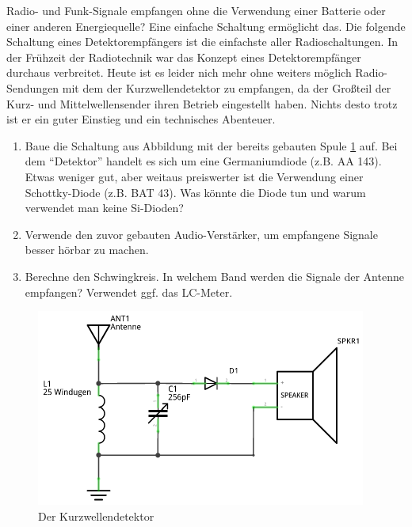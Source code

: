 Radio- und Funk-Signale empfangen ohne die Verwendung einer Batterie oder einer
anderen Energiequelle? Eine einfache Schaltung ermöglicht das. Die folgende
Schaltung eines Detektorempfängers ist die einfachste aller Radioschaltungen. In
der Frühzeit der Radiotechnik war das Konzept eines Detektorempfänger durchaus
verbreitet. Heute ist es leider nich mehr ohne weiters möglich Radio-Sendungen
mit dem der Kurzwellendetektor zu empfangen, da der Großteil der Kurz- und
Mittelwellensender ihren Betrieb eingestellt haben. Nichts desto trotz ist er
ein guter Einstieg und ein technisches Abenteuer.

\begin{enumerate}
    \item Baue die Schaltung aus Abbildung mit der bereits gebauten Spule
      \ref{kd} auf. Bei dem "`Detektor"' handelt es sich um eine Germaniumdiode
      (z.B. AA 143). Etwas weniger gut, aber weitaus preiswerter ist die
      Verwendung einer Schottky-Diode (z.B. BAT 43).  Was könnte die Diode tun
      und warum verwendet man keine Si-Dioden?
   \item Verwende den zuvor gebauten Audio-Verstärker, um empfangene Signale
     besser hörbar zu machen.
   \item Berechne den Schwingkreis. In welchem Band werden die Signale der
     Antenne empfangen? Verwendet ggf. das LC-Meter.  
\end{enumerate}

\begin{figure}[H]
    \centering
    \includegraphics[scale=1]{Kurzwellendetektor/Bilder/Kurzwellendetektor_Schaltplan.pdf}
    \caption{Der Kurzwellendetektor}
    \label{kd}
\end{figure}

